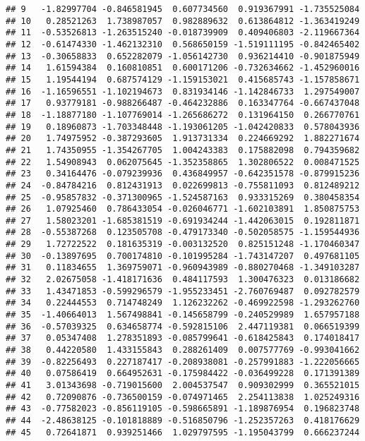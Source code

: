 \documentclass[
]{article}
\begin{document}
\begin{verbatim}
## 9   -1.82997704 -0.846581945  0.607734560  0.919367991 -1.735525084
## 10   0.28521263  1.738987057  0.982889632  0.613864812 -1.363419249
## 11  -0.53526813 -1.263515240 -0.018739909  0.409406803 -2.119667364
## 12  -0.61474330 -1.462132310  0.568650159 -1.519111195 -0.842465402
## 13  -0.30658833  0.652282079 -1.056142730  0.936214410 -0.901875949
## 14   1.61594384  0.160810851  0.600171206 -0.732634662 -1.452960016
## 15   1.19544194  0.687574129 -1.159153021  0.415685743 -1.157858671
## 16  -1.16596551 -1.102194673  0.831934146 -1.142846733  1.297549007
## 17   0.93779181 -0.988266487 -0.464232886  0.163347764 -0.667437048
## 18  -1.18877180 -1.107769014 -1.265686272  0.131964150  0.266770761
## 19   0.18960873 -1.703348448 -1.193061205 -1.042420833  0.578043936
## 20   1.74975952 -0.387293605  1.913731334  0.224669292  1.882271674
## 21   1.74350955 -1.354267705  1.004243383  0.175882098  0.794359682
## 22   1.54908943  0.062075645 -1.352358865  1.302806522  0.008471525
## 23   0.34164476 -0.079239936  0.436849957 -0.642351578 -0.879915236
## 24  -0.84784216  0.812431913  0.022699813 -0.755811093  0.812489212
## 25  -0.95857832 -0.371300965 -1.524587163  0.933315269  0.380458354
## 26   1.07925460  0.786433054 -0.026046771 -1.602103891  1.850875753
## 27   1.58023201 -1.685381519 -0.691934244 -1.442063015  0.192811871
## 28  -0.55387268  0.123505708 -0.479173340 -0.502058575 -1.159544936
## 29   1.72722522  0.181635319 -0.003132520  0.825151248 -1.170460347
## 30  -0.13897695  0.700174810 -0.101995284 -1.743147207  0.497681105
## 31   0.11834655  1.369759071 -0.960943989 -0.880270468 -1.349103287
## 32   2.02675058 -1.418171636  0.484117593  1.300476323  0.013186682
## 33   1.43471853 -0.599296579 -1.955233451 -2.760769487  0.092782579
## 34   0.22444553  0.714748249  1.126232262 -0.469922598 -1.293262760
## 35  -1.40664013  1.567498841 -0.145658799 -0.240529989  1.657957188
## 36  -0.57039325  0.634658774 -0.592815106  2.447119381  0.066519399
## 37   0.05347408  1.278351893 -0.085799641 -0.618425843  0.174018417
## 38   0.44220580  1.433155843  0.288261409  0.007577769 -0.993041662
## 39  -0.82256493  0.227187417 -0.208938081 -0.257991883 -1.222056665
## 40   0.07586419  0.664952631 -0.175984422 -0.036499228  0.171391389
## 41   3.01343698 -0.719015600  2.004537547  0.909302999  0.365521015
## 42   0.72090876 -0.736500159 -0.074971465  2.254113838  1.025249316
## 43  -0.77582023 -0.856119105 -0.598665891 -1.189876954  0.196823748
## 44  -2.48638125 -0.101818889 -0.516850796 -1.252357263  0.418176629
## 45   0.72641871  0.939251466  1.029797595 -1.195043799  0.666237244

\end{verbatim}
\end{document}
